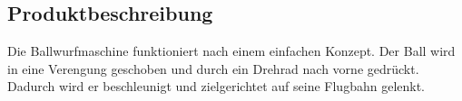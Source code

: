 \subsection{Produktbeschreibung}

Die Ballwurfmaschine funktioniert nach einem einfachen Konzept. Der Ball wird in eine Verengung geschoben und durch ein Drehrad nach vorne gedrückt. Dadurch wird er beschleunigt und zielgerichtet auf seine Flugbahn gelenkt.


\newpage

\newpage

\newpage
